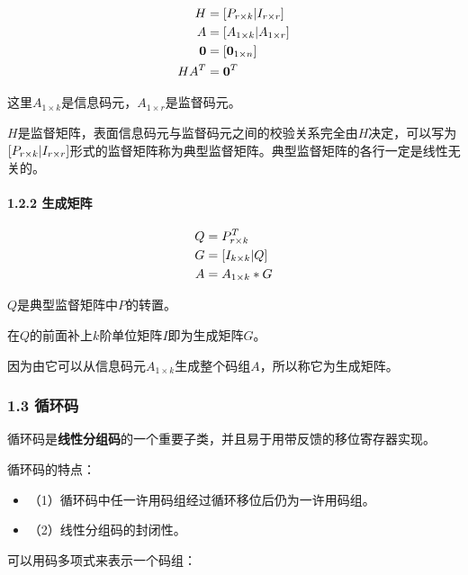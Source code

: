 \documentclass[
]{article}
\begin{document}
\begin{align}
H &= [P_{r \times k} \space | \space I_{r \times r}]\\
A &= [A_{1 \times k} \space | \space A_{1 \times r}]\\
\boldsymbol0 &= [\boldsymbol0_{1 \times n}]\\
HA^T &= \boldsymbol0^T \\
\end{align}

这里\(A_{1 \times k}\)是信息码元，\(A_{1 \times r}\)是监督码元。

\(H\)是监督矩阵，表面信息码元与监督码元之间的校验关系完全由\(H\)决定，可以写为\([P_{r \times k} \space | \space I_{r \times r}]\)形式的监督矩阵称为典型监督矩阵。典型监督矩阵的各行一定是线性无关的。

\hypertarget{header-n20}{%
\paragraph{1.2.2 生成矩阵}\label{header-n20}}

\begin{align}
Q &= P_{r \times k}^T\\
G &= [I_{k \times k} \space | \space Q]\\
A &= A_{1 \times k}*G\\
\end{align}

\(Q\)是典型监督矩阵中\(P\)的转置。

在\(Q\)的前面补上\(k\)阶单位矩阵\(I\)即为生成矩阵\(G\)。

因为由它可以从信息码元\(A_{1 \times k}\)生成整个码组\(A\)，所以称它为生成矩阵。

\hypertarget{header-n25}{%
\subsubsection{1.3 循环码}\label{header-n25}}

循环码是\textbf{线性分组码}的一个重要子类，并且易于用带反馈的移位寄存器实现。

循环码的特点：

\begin{itemize}
\item
  （1）循环码中任一许用码组经过循环移位后仍为一许用码组。
\item
  （2）线性分组码的封闭性。
\end{itemize}

可以用码多项式来表示一个码组：
\end{document}
